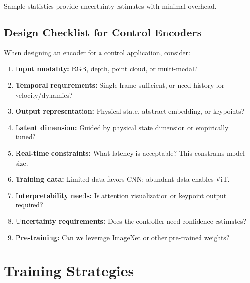 Sample statistics provide uncertainty estimates with minimal overhead.


\subsection{Design Checklist for Control Encoders}

When designing an encoder for a control application, consider:

\begin{enumerate}
    \item \textbf{Input modality:} RGB, depth, point cloud, or multi-modal?

    \item \textbf{Temporal requirements:} Single frame sufficient, or need history for velocity/dynamics?

    \item \textbf{Output representation:} Physical state, abstract embedding, or keypoints?

    \item \textbf{Latent dimension:} Guided by physical state dimension or empirically tuned?

    \item \textbf{Real-time constraints:} What latency is acceptable? This constrains model size.

    \item \textbf{Training data:} Limited data favors CNN; abundant data enables ViT.

    \item \textbf{Interpretability needs:} Is attention visualization or keypoint output required?

    \item \textbf{Uncertainty requirements:} Does the controller need confidence estimates?

    \item \textbf{Pre-training:} Can we leverage ImageNet or other pre-trained weights?
\end{enumerate}

\section{Training Strategies}
\label{sec:training_strategies}

